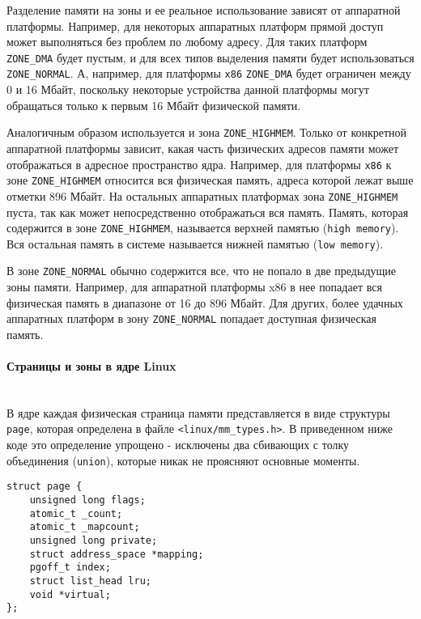 \documentclass[12pt]{article}
\begin{document}
Разделение памяти на зоны и ее реальное использование зависят от аппаратной платформы. Например, для некоторых аппаратных платформ 
прямой доступ может выполняться без проблем по любому адресу. Для таких платформ \verb!ZONE_DMA! будет пустым, и для всех типов выделения памяти будет использоваться \verb!ZONE_NORMAL!.
А, например, для платформы \verb!x86! \verb!ZONE_DMA! будет ограничен между 0 и 16 Мбайт, поскольку некоторые устройства данной платформы могут обращаться только к первым 16 Мбайт физической памяти.

Аналогичным образом используется и зона \verb!ZONE_HIGHMEM!. Только от конкретной
аппаратной платформы зависит, какая часть физических адресов памяти может отображаться в адресное пространство ядра. Например, для платформы \verb!x86! 
к зоне \verb!ZONE_HIGHMEM! относится вся физическая память, адреса которой лежат выше отметки 896 Мбайт.
На остальных аппаратных платформах зона \verb!ZONE_HIGHMEM! пуста, так как может непосредственно отображаться вся память. Память,
которая содержится в зоне \verb!ZONE_HIGHMEM!, называется верхней памятью (\verb!high memory!). Вся остальная память в системе называется нижней памятью (\verb!low memory!).

В зоне \verb!ZONE_NORMAL! обычно содержится все, что не попало в две предыдущие зоны
памяти. Например, для аппаратной платформы x86 в нее попадает вся физическая память
в диапазоне от 16 до 896 Мбайт. Для других, более удачных аппаратных платформ в зону
\verb!ZONE_NORMAL! попадает доступная физическая память.

\paragraph*{Страницы и зоны в ядре Linux} ~\\

В ядре каждая физическая страница памяти представляется в виде структуры \verb!page!,
которая определена в файле \verb!<linux/mm_types.h>!. В приведенном ниже коде это определение упрощено - исключены два сбивающих с толку объединения (\verb!union!),
которые никак не проясняют основные моменты.

\begin{lstlisting}
struct page {
    unsigned long flags;
    atomic_t _count;
    atomic_t _mapcount;
    unsigned long private;
    struct address_space *mapping;
    pgoff_t index;
    struct list_head lru;
    void *virtual;
};
\end{lstlisting}
\end{document}
